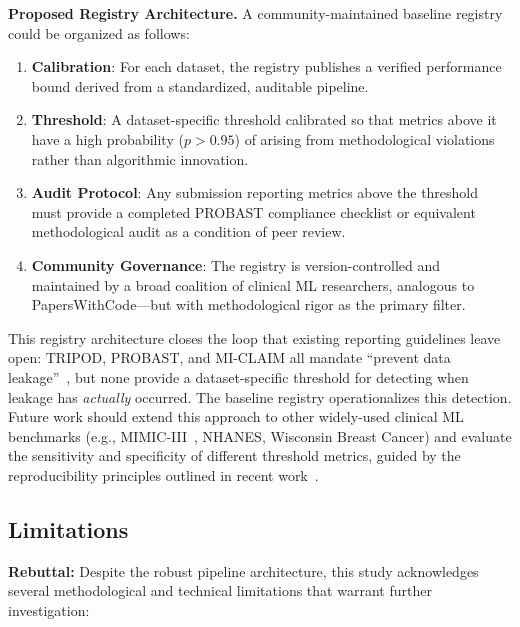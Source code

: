 \documentclass[3p,twocolumn]{elsarticle}
\begin{document}
\textbf{Proposed Registry Architecture.} A community-maintained baseline registry could be organized as follows:

\begin{enumerate}[nosep]
    \item \textbf{Calibration}: For each dataset, the registry publishes a verified performance bound derived from a standardized, auditable pipeline.
    \item \textbf{Threshold}: A dataset-specific threshold calibrated so that metrics above it have a high probability ($p > 0.95$) of arising from methodological violations rather than algorithmic innovation.
    \item \textbf{Audit Protocol}: Any submission reporting metrics above the threshold must provide a completed PROBAST compliance checklist or equivalent methodological audit as a condition of peer review.
    \item \textbf{Community Governance}: The registry is version-controlled and maintained by a broad coalition of clinical ML researchers, analogous to PapersWithCode---but with methodological rigor as the primary filter.
\end{enumerate}

This registry architecture closes the loop that existing reporting guidelines leave open: TRIPOD, PROBAST, and MI-CLAIM all mandate ``prevent data leakage''~\cite{Collins2015TRIPOD, Moons2019PROBAST, Norgeot2020MI-CLAIM}, but none provide a dataset-specific threshold for detecting when leakage has \textit{actually} occurred. The baseline registry operationalizes this detection. Future work should extend this approach to other widely-used clinical ML benchmarks (e.g., MIMIC-III~\cite{Johnson2016MIMIC}, NHANES, Wisconsin Breast Cancer) and evaluate the sensitivity and specificity of different threshold metrics, guided by the reproducibility principles outlined in recent work~\cite{McDermott2021Reproducibility, Vollmer2020Machine}.

\subsection{Limitations}

\textbf{Rebuttal:} Despite the robust pipeline architecture, this study acknowledges several methodological and technical limitations that warrant further investigation:
\end{document}
